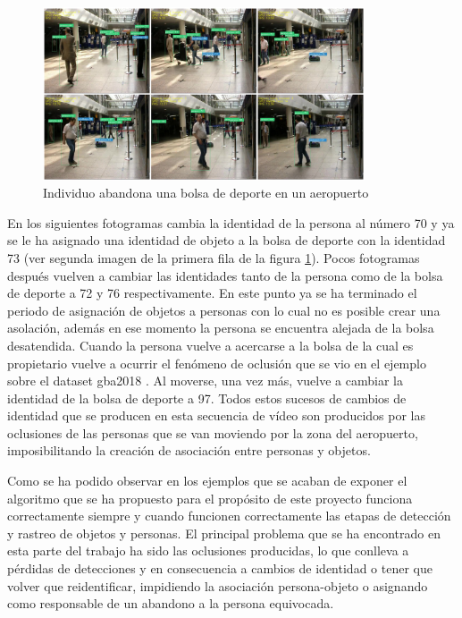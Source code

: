 \begin{figure}[ht]
\centering
\includegraphics[width=0.85\textwidth]{img/chapters/resultados/abandono/4.png}
\caption{\label{fig:results4}Individuo abandona una bolsa de deporte en un aeropuerto \cite{pets2007-dataset}}
\end{figure}

En los siguientes fotogramas cambia la identidad de la persona al número 70 y ya se le ha asignado una identidad de objeto a la bolsa de deporte con la identidad 73 (ver segunda imagen de la primera fila de la figura \ref{fig:results4}). Pocos fotogramas después vuelven a cambiar las identidades tanto de la persona como de la bolsa de deporte a 72 y 76 respectivamente. En este punto ya se ha terminado el periodo de asignación de objetos a personas con lo cual no es posible crear una asolación, además en ese momento la persona se encuentra alejada de la bolsa desatendida. Cuando la persona vuelve a acercarse a la bolsa de la cual es propietario vuelve a ocurrir el fenómeno de oclusión que se vio en el ejemplo sobre el dataset \gls{gba2018} \cite{gba-dataset}. Al moverse, una vez más, vuelve a cambiar la identidad de la bolsa de deporte a 97. Todos estos sucesos de cambios de identidad que se producen en esta secuencia de vídeo son producidos por las oclusiones de las personas que se van moviendo por la zona del aeropuerto, imposibilitando la creación de asociación entre personas y objetos.

Como se ha podido observar en los ejemplos que se acaban de exponer el algoritmo que se ha propuesto para el propósito de este proyecto funciona correctamente siempre y cuando funcionen correctamente las etapas de detección y rastreo de objetos y personas. El principal problema que se ha encontrado en esta parte del trabajo ha sido las oclusiones producidas, lo que conlleva a pérdidas de detecciones y en consecuencia a cambios de identidad o tener que volver que reidentificar, impidiendo la asociación persona-objeto o asignando como responsable de un abandono a la persona equivocada.

